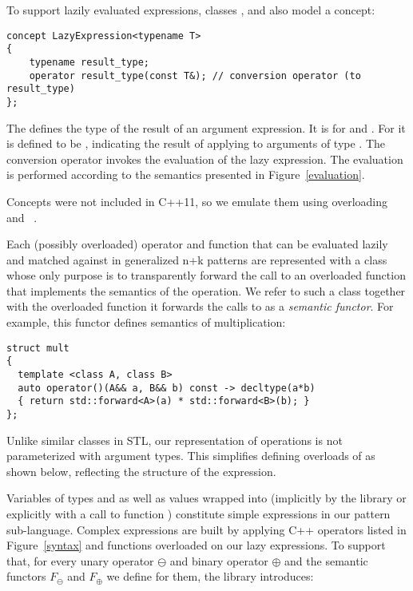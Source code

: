 To support lazily evaluated expressions, classes , 
 and  also model a  
concept:

\begin{lstlisting}[keepspaces,columns=flexible]
concept LazyExpression<typename T> 
{
    typename result_type;
    operator result_type(const T&); // conversion operator (to result_type)
};
\end{lstlisting}

\noindent
The  defines the type of the result of an argument expression.
It is  for  and . 
For  it is defined to be , 
indicating the result of applying  to arguments of type 
 .
The conversion operator invokes the evaluation of the 
lazy expression. The evaluation is performed according to the semantics 
presented in Figure~\ref{evaluation}.

Concepts were not included in C++11, so we emulate them using overloading and 
~\cite{jarvi:03:cuj_arbitrary_overloading}.

Each (possibly overloaded) operator and function that can be evaluated lazily 
and matched against in generalized n+k patterns are represented with a class whose 
only purpose is to transparently forward the call to an overloaded function that 
implements the semantics of the operation. We refer to such a class together with 
the overloaded function it forwards the calls to as a \emph{semantic functor}.
For example, this functor defines semantics of multiplication:

\begin{lstlisting}[keepspaces,columns=flexible]
struct mult 
{
  template <class A, class B> 
  auto operator()(A&& a, B&& b) const -> decltype(a*b) 
  { return std::forward<A>(a) * std::forward<B>(b); }   
};
\end{lstlisting}

\noindent
Unlike similar classes in STL, our representation of operations is not 
parameterized with argument types. This simplifies defining overloads of 
 as shown below, reflecting the structure of the 
expression.

Variables of types  and  as well as values 
wrapped into  (implicitly by the library or explicitly with a 
call to function ) constitute simple expressions in our pattern 
sub-language. Complex expressions are built by applying C++ operators 
listed in Figure~\ref{syntax} and functions overloaded on our lazy expressions. 
To support that, for every unary operator $\ominus$ and binary operator $\oplus$ 
and the semantic functors $F_\ominus$ and $F_\oplus$ we define for them, the 
library introduces:

